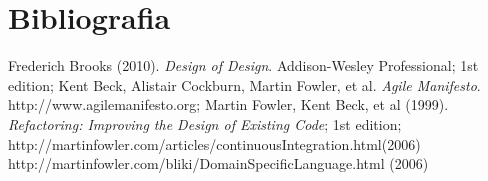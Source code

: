 \section{Bibliografia}

\begin{thebibliography}{12} 

 Frederich Brooks (2010). \textit{Design of Design}. Addison-Wesley Professional; 1st edition;
 Kent Beck, Alistair Cockburn, Martin Fowler, et al. \textit{Agile Manifesto}. http://www.agilemanifesto.org;
 Martin Fowler, Kent Beck, et al (1999). \textit{Refactoring: Improving the Design of Existing Code}; 1st edition;
 http://martinfowler.com/articles/continuousIntegration.html(2006)
 http://martinfowler.com/bliki/DomainSpecificLanguage.html (2006)


\end{thebibliography}
